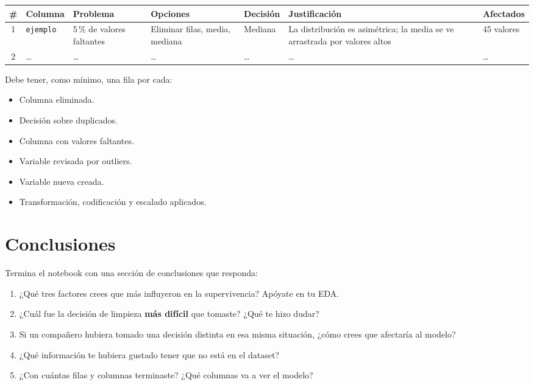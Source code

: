\documentclass[11pt,a4paper]{article}
\newcommand{\col}[1]{\texttt{#1}}
\begin{document}
{\small
\begin{tabularx}{\textwidth}{@{}c l X X l X l@{}}
\toprule
\textbf{\#} & \textbf{Columna} & \textbf{Problema} & \textbf{Opciones} &
\textbf{Decisión} & \textbf{Justificación} & \textbf{Afectados} \\
\midrule
1 & \col{ejemplo} & 5\,\% de valores faltantes & Eliminar filas, media, mediana &
  Mediana & La distribución es asimétrica; la media se ve arrastrada por valores altos &
  45 valores \\
2 & \ldots & \ldots & \ldots & \ldots & \ldots & \ldots \\
\bottomrule
\end{tabularx}
}

\medskip
Debe tener, como mínimo, una fila por cada:
\begin{itemize}
  \item Columna eliminada.
  \item Decisión sobre duplicados.
  \item Columna con valores faltantes.
  \item Variable revisada por outliers.
  \item Variable nueva creada.
  \item Transformación, codificación y escalado aplicados.
\end{itemize}

\section*{Conclusiones}

Termina el notebook con una sección de conclusiones que responda:
\begin{enumerate}
  \item ¿Qué tres factores crees que más influyeron en la supervivencia? Apóyate en tu EDA.
  \item ¿Cuál fue la decisión de limpieza \textbf{más difícil} que tomaste? ¿Qué te hizo dudar?
  \item Si un compañero hubiera tomado una decisión distinta en esa misma situación,
        ¿cómo crees que afectaría al modelo?
  \item ¿Qué información te hubiera gustado tener que no está en el dataset?
  \item ¿Con cuántas filas y columnas terminaste? ¿Qué columnas va a ver el modelo?
\end{enumerate}
\end{document}
